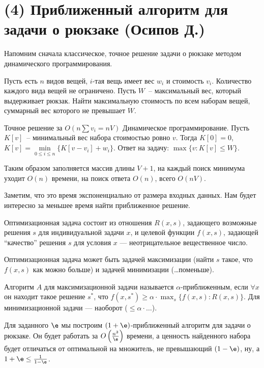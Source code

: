 \section{(4) Приближенный алгоритм для задачи о рюкзаке (Осипов Д.)}
Напомним сначала классическое, точное решение задачи о рюкзаке методом динамического программирования.

\begin{problem*}
	Пусть есть $n$ видов вещей, $i$-тая вещь имеет вес $w_i$ и стоимость $v_i$. Количество каждого вида вещей не ограничено. Пусть $W$~-- максимальный вес, который выдерживает рюкзак. Найти максимальную стоимость по всем наборам вещей, суммарный вес которого не превышает $W$.
\end{problem*}

\begin{algodescription}{Точное решение за $O\left(n\sum{v_i}=nV\right)$} Динамическое программирование. Пусть $K[v]$~-- минимальный вес набора стоимостью ровно $v$. Тогда $K[0] = 0$, $K[v] = \min\limits_{0\le i\le n}\{K[v-v_i] + w_i\}$. Ответ на задачу: $\max\{v : K[v] \leq W\}$.

Таким образом заполняется массив длины $V+1$, на каждый поиск минимума уходит $O(n)$ времени, на поиск ответа $O(n)$, всего $O(nV)$.
\end{algodescription}

Заметим, что это время экспоненциально от размера входных данных.
Нам будет интересно за меньшее время найти приближенное решение.
\begin{definition*}
Оптимизационная задача состоит из отношения $R(x,s)$, задающего возможные решения $s$ для индивидуальной задачи $x$,
и целевой функции $f(x,s)$, задающей ``качество'' решения $s$ для условия $x$ --- неотрицательное вещественное число.

Оптимизационная задача может быть задачей максимизации (найти $s$ такое, что $f(x,s)$ как можно больше)
и задачей минимизации (\ldots поменьше). 

Алгоритм $A$ для максимизационной задачи называется $\alpha$-приближенным,
если $\forall x$ он находит такое решение $s^*$, что $f(x,s^*)\ge \alpha\cdot \max_s \{f(x,s)\colon R(x,s)\}$.
Для минимизационной задачи --- наоборот ($\le \alpha \cdot \ldots$).
\end{definition*}

Для заданного $\e$ мы построим $(1+\e)$-приближенный алгоритм для задачи о рюкзаке.
Он будет работать за $O\left(\frac{n^3}{\e}\right)$ времени, а ценность найденного набора будет отличаться от оптимальной на множитель, не превышающий $(1-\e)$,
ну, а $1+\e \le \frac1{1-\e}$.

